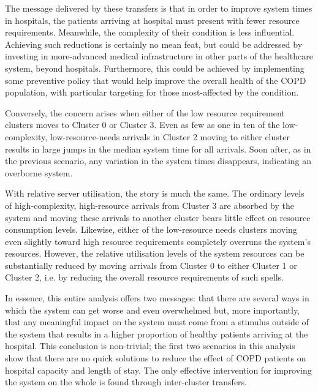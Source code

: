 \begin{table}
    \centering%
    \resizebox{\textwidth}{!}{%
        
    }
    \caption{%
        Proportional changes in median relative utilisation for selected cluster
        transfers
    }\label{tab:moving_util}
\end{table}

The message delivered by these transfers is that in order to improve system
times in hospitals, the patients arriving at hospital must present with fewer
resource requirements. Meanwhile, the complexity of their condition is less
influential. Achieving such reductions is certainly no mean feat, but could be
addressed by investing in more-advanced medical infrastructure in other parts of
the healthcare system, beyond hospitals. Furthermore, this could be achieved by
implementing some preventive policy that would help improve the overall health
of the COPD population, with particular targeting for those most-affected by the
condition.

Conversely, the concern arises when either of the low resource requirement
clusters moves to Cluster 0 or Cluster 3. Even as few as one in ten of the
low-complexity, low-resource-needs arrivals in Cluster 2 moving to either
cluster results in large jumps in the median system time for all arrivals. Soon
after, as in the previous scenario, any variation in the system times
disappears, indicating an overborne system.

With relative server utilisation, the story is much the same. The ordinary
levels of high-complexity, high-resource arrivals from Cluster 3 are absorbed by
the system and moving these arrivals to another cluster bears little effect on
resource consumption levels. Likewise, either of the low-resource needs clusters
moving even slightly toward high resource requirements completely overruns the
system’s resources. However, the relative utilisation levels of the system
resources can be substantially reduced by moving arrivals from Cluster 0 to
either Cluster 1 or Cluster 2, i.e. by reducing the overall resource
requirements of such spells.

In essence, this entire analysis offers two messages: that there are several
ways in which the system can get worse and even overwhelmed but, more
importantly, that any meaningful impact on the system must come from a stimulus
outside of the system that results in a higher proportion of healthy patients
arriving at the hospital. This conclusion is non-trivial; the first two
scenarios in this analysis show that there are no quick solutions to reduce the
effect of COPD patients on hospital capacity and length of stay. The only
effective intervention for improving the system on the whole is found through
inter-cluster transfers.



